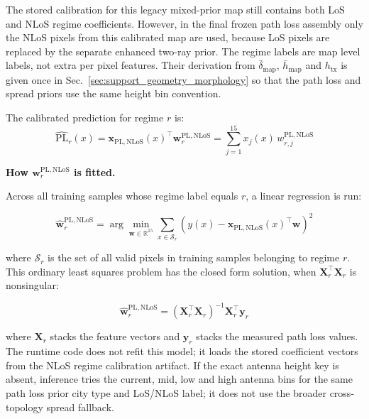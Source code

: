 The stored calibration for this legacy mixed-prior map still contains both LoS
and NLoS regime coefficients. However, in the final frozen
path loss assembly only the NLoS pixels from this calibrated map are used,
because LoS pixels are replaced by the separate enhanced two-ray
prior.
The regime labels are map level labels, not extra per pixel features. Their
derivation from \(\bar\delta_{\mathrm{map}}\), \(\bar h_{\mathrm{map}}\) and
\(h_{\mathrm{tx}}\) is given once in Sec.~\ref{sec:support_geometry_morphology}
so that the path loss and spread priors use the same height bin convention.

The calibrated prediction for regime $r$ is:
\begin{equation}
\widehat{\mathrm{PL}}_{r}(x)
=
\textbf{x}_{\mathrm{PL,NLoS}}(x)^\top
\textbf{w}^{\mathrm{PL,NLoS}}_{r}
=
\sum_{j=1}^{15} x_j(x)\,w^{\mathrm{PL,NLoS}}_{r,j}
\label{eq:pl_cal}
\end{equation}

\par\smallskip
\noindent\textbf{How $\textbf{w}^{\mathrm{PL,NLoS}}_{r}$ is fitted.}
\par\smallskip
\noindent Across all training samples whose regime label equals $r$, a linear
regression is run:

\begin{equation}
\hat{\textbf{w}}^{\mathrm{PL,NLoS}}_{r}
=
\arg\min_{\textbf{w}\in\mathbb{R}^{15}} \sum_{x \in \mathcal{S}_r} \left(y(x) - \textbf{x}_{\mathrm{PL,NLoS}}(x)^\top \textbf{w}\right)^2
\label{eq:ols}
\end{equation}

where $\mathcal{S}_r$ is the set of all valid pixels in training samples
belonging to regime $r$. This ordinary least squares problem has the closed
form solution, when \(\textbf{X}_r^\top\textbf{X}_r\) is nonsingular:

\begin{equation}
\hat{\textbf{w}}^{\mathrm{PL,NLoS}}_{r}
=
\left(\textbf{X}_r^\top \textbf{X}_r\right)^{-1}
\textbf{X}_r^\top \textbf{y}_r
\label{eq:ols_closed}
\end{equation}

where $\textbf{X}_r$ stacks the feature vectors and $\textbf{y}_r$ stacks
the measured path loss values. The runtime code does not refit this model; it
loads the stored coefficient vectors from the NLoS regime calibration artifact.
If the exact antenna height key is absent, inference tries the current, mid,
low and high antenna bins for the same path loss prior city type and LoS/NLoS
label; it does not use the broader cross-topology spread fallback.

